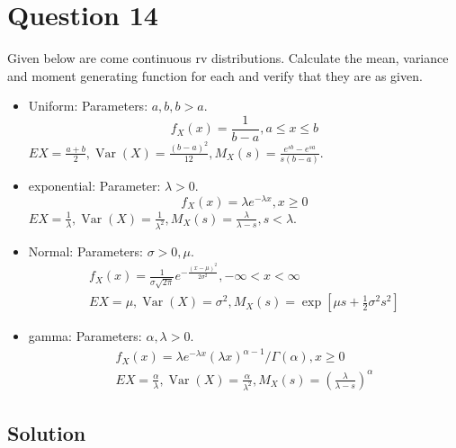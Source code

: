 \section*{Question 14}

Given below are come continuous rv distributions.
Calculate the mean, variance and moment generating function for each and verify that they are as given.
\begin{itemize}
    \item Uniform: Parameters: \( a, b, b>a \).
          \begin{equation*}
              f_{X}(x)=\frac{1}{b-a}, a \leq x \leq b
          \end{equation*}
          \( E X=\frac{a+b}{2}, \operatorname{Var}(X)=\frac{(b-a)^{2}}{12}, M_{X}(s)=\frac{e^{s b}-e^{s a}}{s(b-a)} \).

    \item exponential: Parameter: \( \lambda>0 \).
          \begin{equation*}
              f_{X}(x)=\lambda e^{-\lambda x}, x \geq 0
          \end{equation*}
          \( E X=\frac{1}{\lambda}, \operatorname{Var}(X)=\frac{1}{\lambda^{2}}, M_{X}(s)=\frac{\lambda}{\lambda-s}, s<\lambda \).

    \item Normal: Parameters: \( \sigma>0, \mu \).
          \begin{equation*}
              \begin{array}{r}
                  f_{X}(x)=\frac{1}{\sigma \sqrt{2 \pi}} e^{-\frac{(x-\mu)^{2}}{2 \sigma^{2}}},-\infty<x<\infty \\
                  E X=\mu, \operatorname{Var}(X)=\sigma^{2}, M_{X}(s)=\exp \left[\mu s+\frac{1}{2} \sigma^{2} s^{2}\right]
              \end{array}
          \end{equation*}

    \item gamma: Parameters: \( \alpha, \lambda>0 \).
          \begin{equation*}
              \begin{array}{r}
                  f_{X}(x)=\lambda e^{-\lambda x}(\lambda x)^{\alpha-1} / \Gamma(\alpha), x \geq 0 \\
                  E X=\frac{\alpha}{\lambda}, \operatorname{Var}(X)=\frac{\alpha}{\lambda^{2}}, M_{X}(s)=\left(\frac{\lambda}{\lambda-s}\right)^{\alpha}
              \end{array}
          \end{equation*}
\end{itemize}

\subsection*{Solution}
